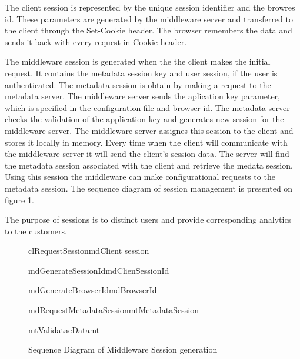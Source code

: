 The client session is represented by the unique session identifier and the browres id. These parameters are generated by the middleware server and transferred to the client through the Set-Cookie header. The browser remembers the data and sends it back with every request in Cookie header.

The middleware session is generated when the the client makes the initial request. It contains the metadata session key and user session, if the user is authenticated. The metadata session is obtain by making a request to the metadata server. The middleware server sends the aplication key parameter, which is specified in the configuration file and browser id. The metadata server checks the validation of the application key and generates new session for the middleware server. The middleware server assignes this session to the client and stores it locally in memory. Every time when the client will communicate with the middleware server it will send the client's session data. The server will find the metadata session associated with the client and retrieve the medata session. Using this session the middleware can make configurational requests to the metadata session. The sequence diagram of session management is presented on figure \ref{fig:arch_sess_uml}.

The purpose of sessions is to distinct users and provide corresponding analytics to the customers.


\begin{figure}[h]
\begin{center}

	\resizebox{1.1\textwidth}{0.5\textwidth} {

	\begin{sequencediagram}

	\begin{call}{cl}{RequestSession}{md}{Client session}

		\begin{call}{md}{GenerateSessionId}{md}{ClienSessionId} \end{call}
		\begin{call}{md}{GenerateBrowserId}{md}{BrowserId} \end{call}
		\begin{call}{md}{RequestMetadataSession}{mt}{MetadataSession} 
			\begin{call}{mt}{ValidataeData}{mt}{}\end{call}
		\end{call}

	\end{call}

	\end{sequencediagram}
	}

\end{center}
\caption{Sequence Diagram of Middleware Session generation}
\label{fig:arch_sess_uml}
\end{figure}



